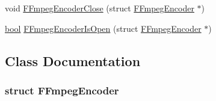 \begin{DoxyCompactItemize}
\item 
void \mbox{\hyperlink{ffmpeg-encoder_8h_af70062a15116373a6307d6b6d044f8e5}{F\+Fmpeg\+Encoder\+Close}} (struct \mbox{\hyperlink{ffmpeg-encoder_8h_struct_f_fmpeg_encoder}{F\+Fmpeg\+Encoder}} $\ast$)
\item 
\mbox{\hyperlink{libretro_8h_a4a26dcae73fb7e1528214a068aca317e}{bool}} \mbox{\hyperlink{ffmpeg-encoder_8h_a4a0cb59ff73f22b4a90443c8ad1aebb8}{F\+Fmpeg\+Encoder\+Is\+Open}} (struct \mbox{\hyperlink{ffmpeg-encoder_8h_struct_f_fmpeg_encoder}{F\+Fmpeg\+Encoder}} $\ast$)
\end{DoxyCompactItemize}


\subsection{Class Documentation}
\label{struct_f_fmpeg_encoder}
\subsubsection{struct F\+Fmpeg\+Encoder}


